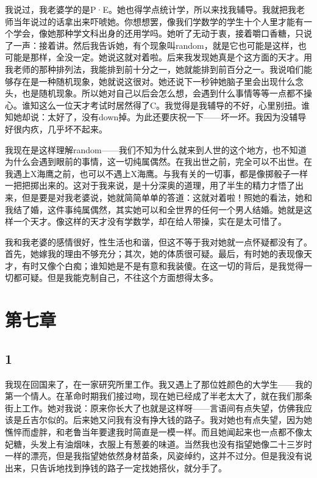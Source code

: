 我说过，我老婆学的是P·E。她也得学点统计学，所以来找我辅导。我就把我老师当年说过的话拿出来吓唬她。你想想罢，像我们学数学的学生十个人里才能有一个学会，像她那种学文科出身的还用学吗。她听了无动于衷，接着嚼口香糖，只说了一声：接着讲。然后我告诉她，有个现象叫random，就是它也可能是这样，也可能是那样，全没一定。她说这就对着啦。后来我发现她真是个这方面的天才。用我老师的那种排列法，我能排到前十分之一，她就能排到前百分之一。我说咱们能够存在是一种随机现象，她就说这很对。她还说下一秒钟她脑子里会出现什么念头，也是随机现象。所以她对自己以后会怎么想，会遇到什么事情等等一点都不操心。谁知这么一位天才考试时居然得了C。我觉得是我辅导的不好，心里别扭。谁知她却说：太好了，没有down掉。为此还要庆祝一下——坏一坏。我因为没辅导好很内疚，几乎坏不起来。 

我现在是这样理解random——我们不知为什么就来到人世的这个地方，也不知道为什么会遇到眼前的事情，这一切纯属偶然。在我出世之前，完全可以不出世。在我遇上X海鹰之前，也可以不遇上X海鹰。与我有关的一切事，都是像掷骰子一样一把把掷出来的。这对于我来说，是十分深奥的道理，用了半生的精力才悟了出来，但是要是对我老婆说，她就简简单单的答道：这就对着啦！照她的看法，她和我结了婚，这件事纯属偶然，其实她可以和全世界的任何一个男人结婚。她就是这样一个天才。像这样的天才没有学数学，却在给人带操，实在是太可惜了。 

我和我老婆的感情很好，性生活也和谐，但这不等于我对她就一点怀疑都没有了。首先，她嫁我的理由不够充分；其次，她的体质很可疑。最后，有时她的表现像天才，有时又像个白痴；谁知她是不是有意和我装傻。在这一切的背后，是我觉得一切都可疑。但是我能克制自己，不往这个方面想得太多。

\section{第七章}

\subsection{1}

我现在回国来了，在一家研究所里工作。我又遇上了那位姓颜色的大学生——我的第一个情人。在革命时期我们接过吻，现在她已经成了半老太大了，就在我们那条街上工作。她对我说：原来你长大了也就是这样呀——言语间有点失望，仿佛我应该是丘吉尔似的。后来她又问我有没有挣大钱的路子。我对她也有点失望，因为她憔悴而虚胖，和老鲁当年要逮我时简直是一模一样。而且她闻起来也一点都不像太妃糖，头发上有油烟味，衣服上有葱姜的味道。当然我也没有指望她像二十三岁时一样的漂亮，但是我指望她依然身材苗条，风姿绰约，这并不过分。但是我没有说出来，只告诉地找到挣钱的路子一定找她搭伙，就分手了。 

